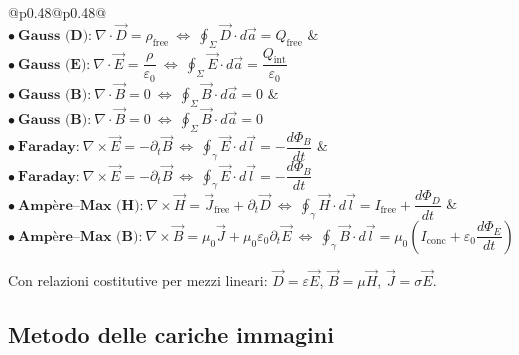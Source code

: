 \documentclass{book}
\begin{document}
\noindent\begin{tabular}{@{}p{}@{\quad}p{}@{}}
\\[6pt]

\(\bullet\ \textbf{Gauss (D):}\ \nabla\!\cdot\!\vec D=\rho_{\mathrm{free}}
\ \Longleftrightarrow\
\displaystyle\oint_{\Sigma}\vec D\!\cdot\!d\vec a=Q_{\mathrm{free}}\) 
&
\(\bullet\ \textbf{Gauss (E):}\ \nabla\!\cdot\!\vec E=\dfrac{\rho}{\varepsilon_0}
\ \Longleftrightarrow\
\displaystyle\oint_{\Sigma}\vec E\!\cdot\!d\vec a=\dfrac{Q_{\mathrm{int}}}{\varepsilon_0}\) \\[6pt]

\(\bullet\ \textbf{Gauss (B):}\ \nabla\!\cdot\!\vec B=0
\ \Longleftrightarrow\
\displaystyle\oint_{\Sigma}\vec B\!\cdot\!d\vec a=0\) 
&
\(\bullet\ \textbf{Gauss (B):}\ \nabla\!\cdot\!\vec B=0
\ \Longleftrightarrow\
\displaystyle\oint_{\Sigma}\vec B\!\cdot\!d\vec a=0\) \\[6pt]

\(\bullet\ \textbf{Faraday:}\ \nabla\times\vec E=-\partial_t\vec B
\ \Longleftrightarrow\
\displaystyle\oint_{\gamma}\vec E\!\cdot\!d\vec l=-\dfrac{d\Phi_B}{dt}\) 
&
\(\bullet\ \textbf{Faraday:}\ \nabla\times\vec E=-\partial_t\vec B
\ \Longleftrightarrow\
\displaystyle\oint_{\gamma}\vec E\!\cdot\!d\vec l=-\dfrac{d\Phi_B}{dt}\) \\[6pt]

\(\bullet\ \textbf{Ampère–Max (H):}\ \nabla\times\vec H=\vec J_{\mathrm{free}}+\partial_t\vec D
\ \Longleftrightarrow\
\displaystyle\oint_{\gamma}\vec H\!\cdot\!d\vec l=I_{\mathrm{free}}+\dfrac{d\Phi_D}{dt}\)
&
\(\bullet\ \textbf{Ampère–Max (B):}\ \nabla\times\vec B=\mu_0\vec J+\mu_0\varepsilon_0\partial_t\vec E
\ \Longleftrightarrow\
\displaystyle\oint_{\gamma}\vec B\!\cdot\!d\vec l=\mu_0\!\left(I_{\mathrm{conc}}+\varepsilon_0\dfrac{d\Phi_E}{dt}\right)\)
\end{tabular}

\endgroup
Con relazioni costitutive per mezzi lineari: $\vec{D}=\varepsilon\vec{E}$, $\vec{B}=\mu\vec{H}$, $\vec{J}=\sigma\vec{E}$.\\

\subsection*{Metodo delle cariche immagini}
\end{document}
